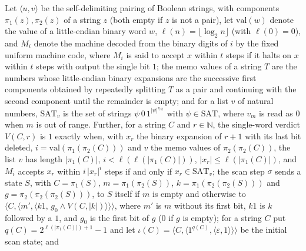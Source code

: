 \begin{theorem}
\label{Complexity.ladner_candidate_readout}
\leanok
{}
Let $\langle u,v\rangle$ be the self-delimiting pairing of Boolean strings, with components $\pi_1(z),\pi_2(z)$ of a string $z$ (both empty if $z$ is not a pair), let $\mathrm{val}(w)$ denote the value of a little-endian binary word $w$, $\ell(n)=\lfloor\log_2 n\rfloor$ (with $\ell(0)=0$), and $M_i$ denote the machine decoded from the binary digits of $i$ by the fixed uniform machine code, where $M_i$ is said to accept $x$ within $t$ steps if it halts on $x$ within $t$ steps with output the single bit $1$; the memo values of a string $T$ are the numbers whose little-endian binary expansions are the successive first components obtained by repeatedly splitting $T$ as a pair and continuing with the second component until the remainder is empty; and for a list $v$ of natural numbers, $\mathrm{SAT}_v$ is the set of strings $\psi\,0\,1^{|\psi|^{v_{|\psi|}}}$ with $\psi\in\mathrm{SAT}$, where $v_m$ is read as $0$ when $m$ is out of range. Further, for a string $C$ and $r\in\mathbb N$, the single-word verdict $V(C,r)$ is $1$ exactly when, with $x_r$ the binary expansion of $r+1$ with its last bit deleted, $i=\mathrm{val}(\pi_1(\pi_2(C)))$ and $v$ the memo values of $\pi_2(\pi_2(C))$, the list $v$ has length $|\pi_1(C)|$, $i<\ell(\ell(|\pi_1(C)|))$, $|x_r|\le\ell(|\pi_1(C)|)$, and $M_i$ accepts $x_r$ within $i\,|x_r|^i$ steps if and only if $x_r\in\mathrm{SAT}_v$; the scan step $\sigma$ sends a state $S$, with $C=\pi_1(S)$, $m=\pi_1(\pi_2(S))$, $k=\pi_1(\pi_2(\pi_2(S)))$ and $g=\pi_2(\pi_2(\pi_2(S)))$, to $S$ itself if $m$ is empty and otherwise to $\langle C,\langle m',\langle k1,\,g_0\wedge V(C,|k|)\rangle\rangle\rangle$, where $m'$ is $m$ without its first bit, $k1$ is $k$ followed by a $1$, and $g_0$ is the first bit of $g$ ($0$ if $g$ is empty); for a string $C$ put $q(C)=2^{\ell(|\pi_1(C)|)+1}-1$ and let $\iota(C)=\langle C,\langle 1^{q(C)},\langle\varepsilon,1\rangle\rangle\rangle$ be the initial scan state; and

\end{theorem}
